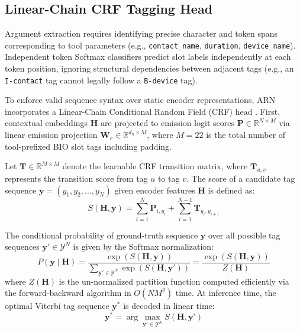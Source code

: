 \documentclass[conference]{IEEEtran}
\begin{document}
\subsection{Linear-Chain CRF Tagging Head}
Argument extraction requires identifying precise character and token spans corresponding to tool parameters (e.g., \texttt{contact\_name}, \texttt{duration}, \texttt{device\_name}). Independent token Softmax classifiers predict slot labels independently at each token position, ignoring structural dependencies between adjacent tags (e.g., an \texttt{I-contact} tag cannot legally follow a \texttt{B-device} tag).

To enforce valid sequence syntax over static encoder representations, ARN incorporates a Linear-Chain Conditional Random Field (CRF) head \cite{lafferty2001conditional}. First, contextual embeddings $\mathbf{H}$ are projected to emission logit scores $\mathbf{P} \in \mathbb{R}^{N \times M}$ via linear emission projection $\mathbf{W}_e \in \mathbb{R}^{d_h \times M}$, where $M=22$ is the total number of tool-prefixed BIO slot tags including padding.

Let $\mathbf{T} \in \mathbb{R}^{M \times M}$ denote the learnable CRF transition matrix, where $\mathbf{T}_{u,v}$ represents the transition score from tag $u$ to tag $v$. The score of a candidate tag sequence $\mathbf{y} = (y_1, y_2, \dots, y_N)$ given encoder features $\mathbf{H}$ is defined as:
\begin{equation}
    S(\mathbf{H}, \mathbf{y}) = \sum_{i=1}^N \mathbf{P}_{i, y_i} + \sum_{i=1}^{N-1} \mathbf{T}_{y_i, y_{i+1}}
\end{equation}

The conditional probability of ground-truth sequence $\mathbf{y}$ over all possible tag sequences $\mathbf{y}' \in \mathcal{Y}^N$ is given by the Softmax normalization:
\begin{equation}
    P(\mathbf{y} \mid \mathbf{H}) = \frac{\exp(S(\mathbf{H}, \mathbf{y}))}{\sum_{\mathbf{y}' \in \mathcal{Y}^N} \exp(S(\mathbf{H}, \mathbf{y}'))} = \frac{\exp(S(\mathbf{H}, \mathbf{y}))}{Z(\mathbf{H})}
\end{equation}
where $Z(\mathbf{H})$ is the un-normalized partition function computed efficiently via the forward-backward algorithm in $O(N M^2)$ time. At inference time, the optimal Viterbi tag sequence $\mathbf{y}^*$ is decoded in linear time:
\begin{equation}
    \mathbf{y}^* = \arg\max_{\mathbf{y}' \in \mathcal{Y}^N} S(\mathbf{H}, \mathbf{y}')
\end{equation}
\end{document}
